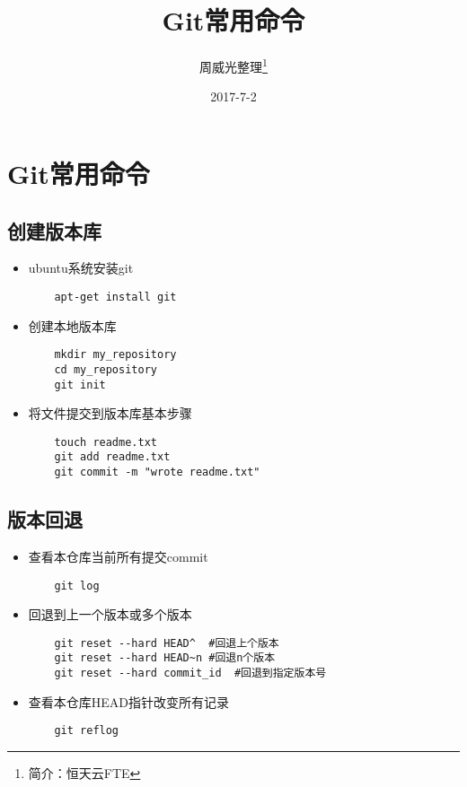 \documentclass[a4paper,left=1.5cm,right=1.5cm,11pt]{article}
\title{Git常用命令}
\author{周威光整理\footnote{简介：恒天云FTE}}
\date{2017-7-2}
\begin{document}
\maketitle
\clearpage
\tableofcontents
\clearpage
\section{Git常用命令}
\subsection{创建版本库}
\begin{itemize}
	\item[1.]ubuntu系统安装git
	\begin{lstlisting}
	apt-get install git
	\end{lstlisting}
	\item[2.]创建本地版本库
	\begin{lstlisting}
	mkdir my_repository
	cd my_repository
	git init
	\end{lstlisting}
	\item[3]将文件提交到版本库基本步骤
	\begin{lstlisting}
	touch readme.txt
	git add readme.txt
	git commit -m "wrote readme.txt"
	\end{lstlisting}
\end{itemize}
\subsection{版本回退}
\begin{itemize}
	\item[1.]查看本仓库当前所有提交commit
	\begin{lstlisting}
	git log
	\end{lstlisting}
	\item[2.]回退到上一个版本或多个版本
	\begin{lstlisting}
	git reset --hard HEAD^  #回退上个版本
	git reset --hard HEAD~n #回退n个版本
	git reset --hard commit_id  #回退到指定版本号
	\end{lstlisting}
	\item[3.]查看本仓库HEAD指针改变所有记录
	\begin{lstlisting}
	git reflog
	\end{lstlisting}
\end{itemize}
\end{document}
